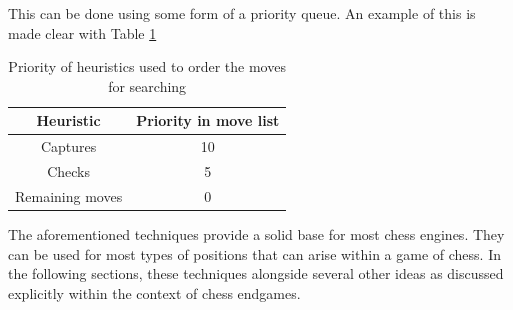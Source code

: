This can be done using some form of a priority queue. An example of this is made clear with Table \ref{tab:heuristicPriorityTable}

\begin{table}[H]
    \centering
    \begin{tabular}{ ||c c|| } 
      \hline
      Heuristic & Priority in move list\\ 
      \hline\hline
      Captures & 10 \\ 
      \hline
      Checks & 5 \\
      \hline
      Remaining moves & 0 \\
      \hline
    \end{tabular}
    \caption{Priority of heuristics used to order the moves for searching}
    \label{tab:heuristicPriorityTable}
\end{table}


The aforementioned techniques provide a solid base for most chess engines. They can be used for most types of positions that can arise within a game of chess. In the following sections, these techniques alongside several other ideas as discussed explicitly within the context of chess endgames.